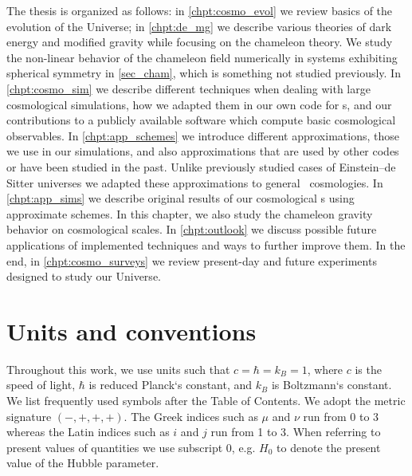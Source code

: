 The thesis is organized as follows: in \autoref{chpt:cosmo_evol} we review basics of the evolution of the Universe; in \autoref{chpt:de_mg} we describe various theories of dark energy and modified gravity while focusing on the chameleon theory. We study the non-linear behavior of the chameleon field numerically in systems exhibiting spherical symmetry in \autoref{sec_cham}, which is something not studied previously. In \autoref{chpt:cosmo_sim} we describe different techniques when dealing with large cosmological simulations, how we adapted them in our own code for \nbodysim s, and our contributions to a publicly available software  which compute basic cosmological observables. In \autoref{chpt:app_schemes} we introduce different approximations, those we use in our simulations, and also approximations that are used by other codes or have been studied in the past. Unlike previously studied cases of Einstein--de Sitter universes we adapted these approximations to general \LCDM\ cosmologies. In \autoref{chpt:app_sims} we describe original results of our cosmological \nbodysim s using approximate schemes. In this chapter, we also study the chameleon gravity behavior on cosmological scales. In \autoref{chpt:outlook} we discuss possible future applications of implemented techniques and ways to further improve them. In the end, in \autoref{chpt:cosmo_surveys} we review present-day and future experiments designed to study our Universe.

\section*{Units and conventions}
Throughout this work, we use units such that $c=\hbar=k_B=1$, where $c$ is the speed of light, $\hbar$ is reduced Planck`s constant, and $k_B$ is Boltzmann`s constant. We list frequently used symbols after the Table of Contents. We adopt the metric signature $(-, +, +, +)$. The Greek indices such as $\mu$ and $\nu$ run from 0 to 3 whereas the Latin indices such as $i$ and $j$ run from 1 to 3. When referring to present values of quantities we use subscript $0$, e.g. $H_0$ to denote the present value of the Hubble parameter.